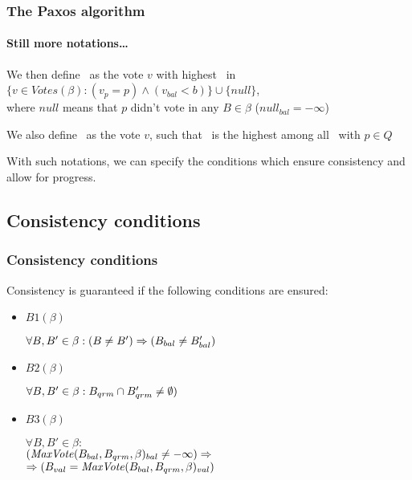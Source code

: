 \documentclass[10 pt]{beamer}
\begin{document}
\begin{frame}
  \frametitle{The Paxos algorithm}
  \framesubtitle{Still more notations\ldots}

  We then define \maxvotep\ as the vote $v$ with highest \vbal\ in 
 $\{v \in Votes(\beta) : (v_p = p) \wedge (v_{bal} < b)\} \cup \{null\}$,\\
 where $null$ means that $p$ didn't vote in any $B \in \beta$ ($null_{bal} = -\infty$)

  \vspace{4 mm}
  We also define \maxvoteq\ as the vote $v$, such that \vbal\ is the highest among all \maxvotep\ with $p \in Q$

  \vspace{8 mm}
  {\small With such notations, we can specify the conditions which ensure consistency and allow for progress.}

\end{frame}

\subsection{Consistency conditions}


\begin{frame}
  \frametitle{Consistency conditions}

  Consistency is guaranteed if the following conditions are ensured:

  \begin{itemize}
    \item $B1(\beta)$
    
    $\forall B, B' \in \beta : (B \neq B') \Rightarrow (B_{bal} \neq B'_{bal})$

    \vspace{4 mm}
    \item $B2(\beta)$ %
  
    $\forall B, B' \in \beta : B_{qrm} \cap B'_{qrm} \neq \emptyset)$
    
    \vspace{4 mm}
    \item $B3(\beta)$
  
    $\forall B, B' \in \beta :$\\
    $(\text{\textit{MaxVote}}(B_{bal}, B_{qrm}, \beta)_{bal} \neq -\infty) \Rightarrow$\\
    $\Rightarrow (B_{val} = \text{\textit{MaxVote}}(B_{bal}, B_{qrm}, \beta)_{val})$
  \end{itemize}

\end{frame}
\end{document}

